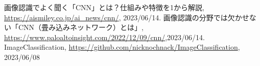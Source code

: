 \documentclass[a4paper, 11pt, titlepage]{jsarticle}
\begin{document}
\begin{thebibliography}{n}
	画像認識でよく聞く「CNN」とは？仕組みや特徴を1から解説, \url{https://aismiley.co.jp/ai_news/cnn/}, 2023/06/14.
	画像認識の分野では欠かせない「CNN（畳み込みネットワーク）とは」, \url{https://www.paloaltoinsight.com/2022/12/09/cnn/},2023/06/14.
	ImageClassification, \url{https://github.com/nicknochnack/ImageClassification}, 2023/06/08
\end{thebibliography}
\end{document}

